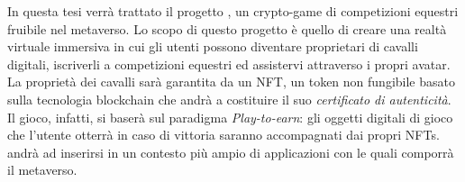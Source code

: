 
In questa tesi verrà trattato il progetto \nomeapp{}, un crypto-game di competizioni equestri fruibile nel metaverso.
%
Lo scopo di questo progetto è quello di creare una realtà virtuale immersiva in cui gli utenti possono diventare proprietari di cavalli digitali, iscriverli a competizioni equestri ed assistervi attraverso i propri avatar.
%
La proprietà dei cavalli sarà garantita da un NFT, un token non fungibile basato sulla tecnologia blockchain che andrà a costituire il suo \textit{certificato di autenticità}.
%
Il gioco, infatti, si baserà sul paradigma \textit{Play-to-earn}: gli oggetti digitali di gioco che l'utente otterrà in caso di vittoria saranno accompagnati dai propri NFTs.
%
\nomeapp{} andrà ad inserirsi in un contesto più ampio di applicazioni con le quali comporrà il metaverso.




